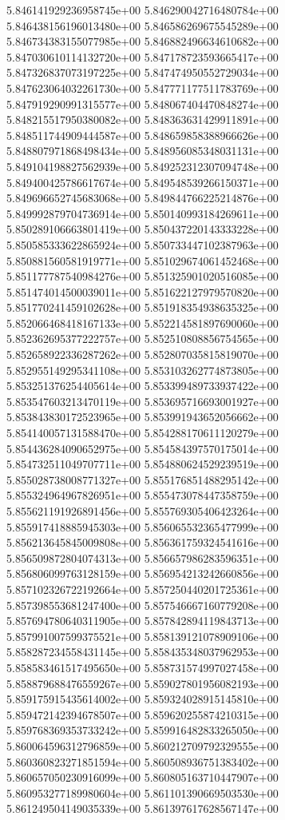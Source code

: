 5.846141929236958745e+00
5.846290042716480784e+00
5.846438156196013480e+00
5.846586269675545289e+00
5.846734383155077985e+00
5.846882496634610682e+00
5.847030610114132720e+00
5.847178723593665417e+00
5.847326837073197225e+00
5.847474950552729034e+00
5.847623064032261730e+00
5.847771177511783769e+00
5.847919290991315577e+00
5.848067404470848274e+00
5.848215517950380082e+00
5.848363631429911891e+00
5.848511744909444587e+00
5.848659858388966626e+00
5.848807971868498434e+00
5.848956085348031131e+00
5.849104198827562939e+00
5.849252312307094748e+00
5.849400425786617674e+00
5.849548539266150371e+00
5.849696652745683068e+00
5.849844766225214876e+00
5.849992879704736914e+00
5.850140993184269611e+00
5.850289106663801419e+00
5.850437220143333228e+00
5.850585333622865924e+00
5.850733447102387963e+00
5.850881560581919771e+00
5.851029674061452468e+00
5.851177787540984276e+00
5.851325901020516085e+00
5.851474014500039011e+00
5.851622127979570820e+00
5.851770241459102628e+00
5.851918354938635325e+00
5.852066468418167133e+00
5.852214581897690060e+00
5.852362695377222757e+00
5.852510808856754565e+00
5.852658922336287262e+00
5.852807035815819070e+00
5.852955149295341108e+00
5.853103262774873805e+00
5.853251376254405614e+00
5.853399489733937422e+00
5.853547603213470119e+00
5.853695716693001927e+00
5.853843830172523965e+00
5.853991943652056662e+00
5.854140057131588470e+00
5.854288170611120279e+00
5.854436284090652975e+00
5.854584397570175014e+00
5.854732511049707711e+00
5.854880624529239519e+00
5.855028738008771327e+00
5.855176851488295142e+00
5.855324964967826951e+00
5.855473078447358759e+00
5.855621191926891456e+00
5.855769305406423264e+00
5.855917418885945303e+00
5.856065532365477999e+00
5.856213645845009808e+00
5.856361759324541616e+00
5.856509872804074313e+00
5.856657986283596351e+00
5.856806099763128159e+00
5.856954213242660856e+00
5.857102326722192664e+00
5.857250440201725361e+00
5.857398553681247400e+00
5.857546667160779208e+00
5.857694780640311905e+00
5.857842894119843713e+00
5.857991007599375521e+00
5.858139121078909106e+00
5.858287234558431145e+00
5.858435348037962953e+00
5.858583461517495650e+00
5.858731574997027458e+00
5.858879688476559267e+00
5.859027801956082193e+00
5.859175915435614002e+00
5.859324028915145810e+00
5.859472142394678507e+00
5.859620255874210315e+00
5.859768369353733242e+00
5.859916482833265050e+00
5.860064596312796859e+00
5.860212709792329555e+00
5.860360823271851594e+00
5.860508936751383402e+00
5.860657050230916099e+00
5.860805163710447907e+00
5.860953277189980604e+00
5.861101390669503530e+00
5.861249504149035339e+00
5.861397617628567147e+00
